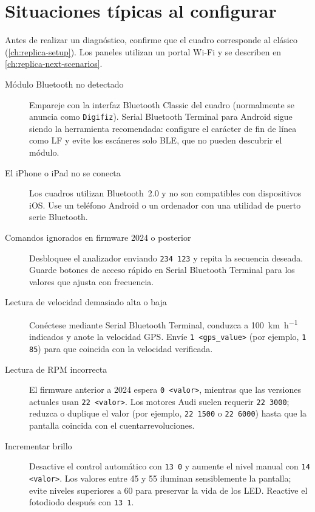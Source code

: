\chapter{Situaciones típicas al configurar \ReplicaGenOne{}}\label{ch:replica-scenarios}

Antes de realizar un diagnóstico, confirme que el cuadro corresponde al \ReplicaGenOne{} clásico (\autoref{ch:replica-setup}). Los paneles \ReplicaNextLong{} utilizan un portal Wi-Fi y se describen en \autoref{ch:replica-next-scenarios}.

\begin{description}
    \item[Módulo Bluetooth no detectado] Empareje con la interfaz Bluetooth Classic del cuadro (normalmente se anuncia como \texttt{Digifiz}). Serial Bluetooth Terminal para Android sigue siendo la herramienta recomendada: configure el carácter de fin de línea como LF y evite los escáneres solo BLE, que no pueden descubrir el módulo.
    \item[El iPhone o iPad no se conecta] Los cuadros \ReplicaGenOneShort{} utilizan Bluetooth~2.0 y no son compatibles con dispositivos iOS. Use un teléfono Android o un ordenador con una utilidad de puerto serie Bluetooth.
    \item[Comandos ignorados en firmware 2024 o posterior] Desbloquee el analizador enviando \verb|234 123| y repita la secuencia deseada. Guarde botones de acceso rápido en Serial Bluetooth Terminal para los valores que ajusta con frecuencia.
    \item[Lectura de velocidad demasiado alta o baja] Conéctese mediante Serial Bluetooth Terminal, conduzca a \SI{100}{\kilo\metre\per\hour} indicados y anote la velocidad GPS. Envíe \verb|1 <gps_value>| (por ejemplo, \verb|1 85|) para que  coincida con la velocidad verificada.
    \item[Lectura de RPM incorrecta] El firmware anterior a 2024 espera \verb|0 <valor>|, mientras que las versiones actuales usan \verb|22 <valor>|. Los motores Audi suelen requerir \verb|22 3000|; reduzca o duplique el valor (por ejemplo, \verb|22 1500| o \verb|22 6000|) hasta que la pantalla coincida con el cuentarrevoluciones.
    \item[Incrementar brillo] Desactive el control automático con \verb|13 0| y aumente el nivel manual con \verb|14 <valor>|. Los valores entre 45 y 55 iluminan sensiblemente la pantalla; evite niveles superiores a 60 para preservar la vida de los LED. Reactive el fotodiodo después con \verb|13 1|.

\end{description}
